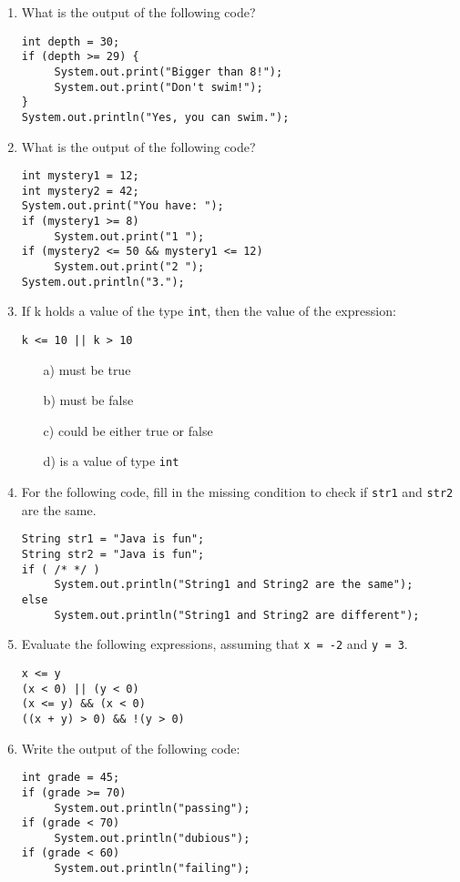 \begin{enumerate}

\item What is the output of the following code?
\begin{lstlisting}
int depth = 30;
if (depth >= 29) {
     System.out.print("Bigger than 8!");
     System.out.print("Don't swim!");
}
System.out.println("Yes, you can swim.");
\end{lstlisting}

\item What is the output of the following code?
\begin{lstlisting}
int mystery1 = 12;
int mystery2 = 42;
System.out.print("You have: ");
if (mystery1 >= 8)
     System.out.print("1 ");
if (mystery2 <= 50 && mystery1 <= 12)
     System.out.print("2 ");
System.out.println("3.");
\end{lstlisting}

\item If k holds a value of the type \verb|int|, then the value of the expression:
\begin{lstlisting}
k <= 10 || k > 10
\end{lstlisting}
\begin{enumerate}
\item[a)] must be true
\item[b)] must be false
\item[c)] could be either true or false
\item[d)] is a value of type \verb|int|
\end{enumerate}

\item For the following code, fill in the missing condition to check if \verb|str1| and \verb|str2| are the same.
\begin{lstlisting}
String str1 = "Java is fun";
String str2 = "Java is fun";
if ( /* */ )
     System.out.println("String1 and String2 are the same");
else
     System.out.println("String1 and String2 are different");
\end{lstlisting}

\item Evaluate the following expressions, assuming that \verb|x = -2| and \verb|y = 3|.
\begin{lstlisting} 
x <= y 
(x < 0) || (y < 0)
(x <= y) && (x < 0)
((x + y) > 0) && !(y > 0)
\end{lstlisting}

\item Write the output of the following code:
\begin{lstlisting}
int grade = 45;
if (grade >= 70)
     System.out.println("passing");
if (grade < 70)
     System.out.println("dubious");
if (grade < 60)
     System.out.println("failing");
\end{lstlisting}


\end{enumerate}
